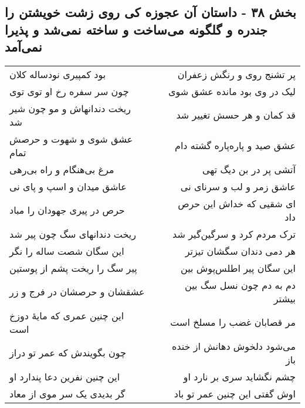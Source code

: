 \begin{center}
\section*{بخش ۳۸ - داستان آن عجوزه کی روی زشت خویشتن را جندره و گلگونه می‌ساخت و ساخته نمی‌شد و پذیرا نمی‌آمد}
\label{sec:sh038}
\begin{longtable}{l p{0.5cm} r}
بود کمپیری نودساله کلان
&&
پر تشنج روی و رنگش زعفران
\\
چون سر سفره رخ او توی توی
&&
لیک در وی بود مانده عشق شوی
\\
ریخت دندانهاش و مو چون شیر شد
&&
قد کمان و هر حسش تغییر شد
\\
عشق شوی و شهوت و حرصش تمام
&&
عشق صید و پاره‌پاره گشته دام
\\
مرغ بی‌هنگام و راه بی‌رهی
&&
آتشی پر در بن دیگ تهی
\\
عاشق میدان و اسپ و پای نی
&&
عاشق زمر و لب و سرنای نی
\\
حرص در پیری جهودان را مباد
&&
ای شقیی که خداش این حرص داد
\\
ریخت دندانهای سگ چون پیر شد
&&
ترک مردم کرد و سرگین‌گیر شد
\\
این سگان شصت ساله را نگر
&&
هر دمی دندان سگشان تیزتر
\\
پیر سگ را ریخت پشم از پوستین
&&
این سگان پیر اطلس‌پوش بین
\\
عشقشان و حرصشان در فرج و زر
&&
دم به دم چون نسل سگ بین بیشتر
\\
این چنین عمری که مایهٔ دوزخ است
&&
مر قصابان غضب را مسلخ است
\\
چون بگویندش که عمر تو دراز
&&
می‌شود دلخوش دهانش از خنده باز
\\
این چنین نفرین دعا پندارد او
&&
چشم نگشاید سری بر نارد او
\\
گر بدیدی یک سر موی از معاد
&&
اوش گفتی این چنین عمر تو باد
\\
\end{longtable}
\end{center}
